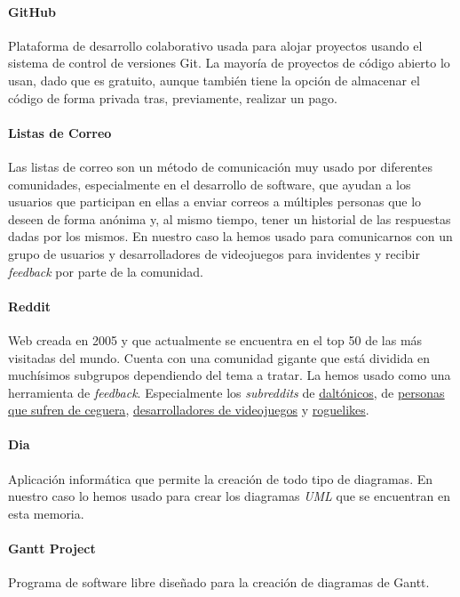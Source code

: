  \paragraph{GitHub} Plataforma de desarrollo colaborativo usada para alojar proyectos usando el sistema de control de versiones Git. La mayoría de proyectos de código abierto lo usan, dado que es gratuito, aunque también tiene la opción de almacenar el código de forma privada tras, previamente, realizar un pago.

 \paragraph{Listas de Correo} Las listas de correo son un método de comunicación muy usado por diferentes comunidades, especialmente en el desarrollo de software, que ayudan a los usuarios que participan en ellas a enviar correos a múltiples personas que lo deseen de forma anónima y, al mismo tiempo, tener un historial de las respuestas dadas por los mismos. En nuestro caso la hemos usado para comunicarnos con un grupo de usuarios y desarrolladores de videojuegos para invidentes y recibir \textit{feedback} por parte de la comunidad.

 \paragraph{Reddit} Web creada en 2005 y que actualmente se encuentra en el top 50 de las más visitadas del mundo. Cuenta con una comunidad gigante que está dividida en muchísimos subgrupos dependiendo del tema a tratar. La hemos usado como una herramienta de \textit{feedback}. Especialmente los \textit{subreddits} de \href{https://www.reddit.com/r/ColorBlind/}{daltónicos}, de \href{https://www.reddit.com/r/blind/}{personas que sufren de ceguera}, \href{https://www.reddit.com/r/gamedev/}{desarrolladores de videojuegos} y \href{https://www.reddit.com/r/roguelikes/}{roguelikes}.

\paragraph{Dia} Aplicación informática que permite la creación de todo tipo de diagramas. En nuestro caso lo hemos usado para crear los diagramas \textit{UML} que se encuentran en esta memoria.

\paragraph{Gantt Project} Programa de software libre diseñado para la creación de diagramas de Gantt.


